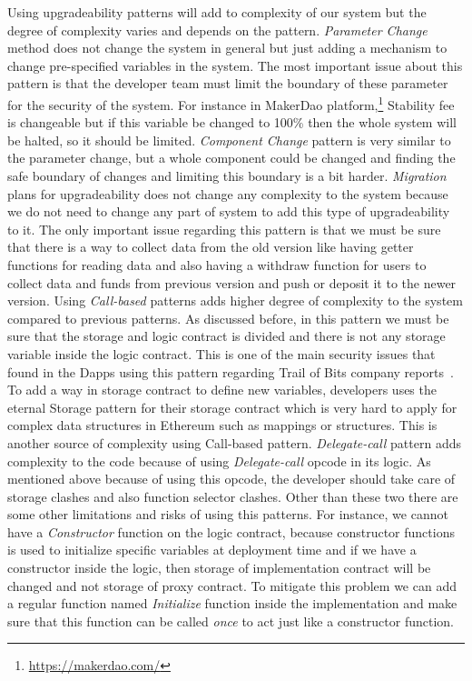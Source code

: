 Using upgradeability patterns will add to complexity of our system but the degree of complexity varies and depends on the pattern. 
\textit{Parameter Change} method does not change the system in general but just adding a mechanism to change pre-specified variables in the system. The most important issue about this pattern is that the developer team must limit the boundary of these parameter for the security of the system. For instance in MakerDao platform,\footnote{\url{https://makerdao.com/}} Stability fee is changeable but if this variable be changed to 100\% then the whole system will be halted, so it should be limited.
\textit{Component Change} pattern is very similar to the parameter change, but a whole component could be changed and finding the safe boundary of changes and limiting this boundary is a bit harder.
\textit{Migration} plans for upgradeability does not change any complexity to the system because we do not need to change any part of system to add this type of upgradeability to it. The only important issue regarding this pattern is that we must be sure that there is a way to collect data from the old version like having getter functions for reading data and also having a withdraw function for users to collect data and funds from previous version and push or deposit it to the newer version.
Using \textit{Call-based} patterns adds higher degree of complexity to the system compared to previous patterns. As discussed before, in this pattern we must be sure that the storage and logic contract is divided and there is not any storage variable inside the logic contract. This is one of the main security issues that found in the Dapps using this pattern regarding Trail of Bits company reports~\cite{tobBlogPost}. To add a way in storage contract to define new variables, developers uses the eternal Storage pattern for their storage contract which is very hard to apply for complex data structures in Ethereum such as mappings or structures. This is another source of complexity using Call-based pattern.
\textit{Delegate-call} pattern adds complexity to the code because of using \textit{Delegate-call} opcode in its logic. As mentioned above because of using this opcode, the developer should take care of storage clashes and also function selector clashes. Other than these two there are some other limitations and risks of using this patterns. For instance, we cannot have a \textit{Constructor} function on the logic contract, because constructor functions is used to initialize specific variables at deployment time and if we have a constructor inside the logic, then storage of implementation contract will be changed and not storage of proxy contract. To mitigate this problem we can add a regular function named \textit{Initialize} function inside the implementation and make sure that this function can be called \emph{once} to act just like a constructor function. 
